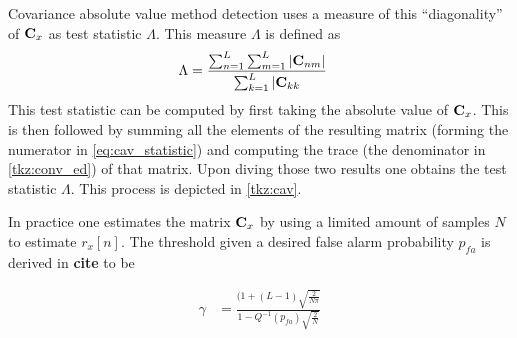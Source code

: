 \documentclass[a4paper, openany, oneside]{memoir}
\begin{document}
Covariance absolute value method detection uses a measure of this ``diagonality'' of $\boldsymbol{\mathbf{C}}_x$ as test statistic $\Lambda$.
This measure $\Lambda$ is defined as
\begin{align}\label{eq:cav_statistic}
\Lambda &= \frac{\sum_{n=1}^{L} \sum_{m=1}^L \left|\boldsymbol{\mathbf{C}}_{nm}\right|}{\sum_{k=1}^L |\boldsymbol{\mathbf{C}}_{kk}}
\end{align} 
This test statistic can be computed by first taking the absolute value of $\boldsymbol{\mathbf{C}}_x$. This is then followed by summing all the elements of the resulting matrix (forming the numerator in \cref{eq:cav_statistic}) and computing the trace (the denominator in \cref{tkz:conv_ed}) of that matrix. Upon diving those two results one obtains the test statistic $\Lambda$. This process is depicted in \cref{tkz:cav}.

In practice one estimates the matrix $\boldsymbol{\mathbf{C}}_x$ by using a limited amount of samples $N$ to estimate $r_x[n]$. The threshold given a desired false alarm probability
$p_{fa}$ is derived in \textbf{cite} to be

\begin{align*}
\gamma &= \frac{(1+(L-1)\sqrt{\frac{2}{N\pi}}}{1-Q^{-1}(p_{fa})\sqrt{\frac{2}{N}}}
\end{align*} 

\end{document}
